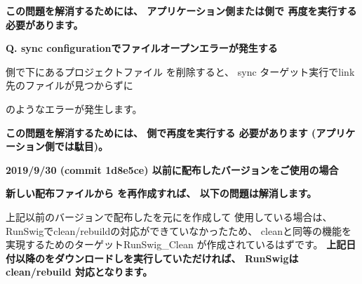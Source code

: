 
\medskip
\bf{この問題を解消するためには、
アプリケーション側または\SprLib 側で 再度\cmake を実行する必要があります。}

\thinrule{\linewidth}

\bf{Q. sync configurationでファイルオープンエラーが発生する}

\medskip
\SprLib 側で下にあるプロジェクトファイル
を削除すると、
sync ターゲット実行でlink先のファイルが見つからずに


のようなエラーが発生します。

\bf{この問題を解消するためには、
\SprLib 側で再度\cmake を実行する 必要があります (アプリケーション側では駄目)。}

\thinrule{\linewidth}

\bf{2019/9/30 (commit 1d8e5ce) 以前に配布したバージョンをご使用の場合}

\bf{新しい配布ファイルから \CMakeLists{} を再作成すれば、 以下の問題は解消します。}

\medskip
上記以前のバージョンで配布したを元に\QCMakeLists{}を作成して
使用している場合は、 RunSwigでclean/rebuildの対応ができていなかったため、
cleanと同等の機能を実現するためのターゲットRunSwig\_Clean が作成されているはずです。
\bf{上記日付以降の\SprLib をダウンロードし\cmake を実行していただければ、
RunSwigはclean/rebuild 対応となります。}


